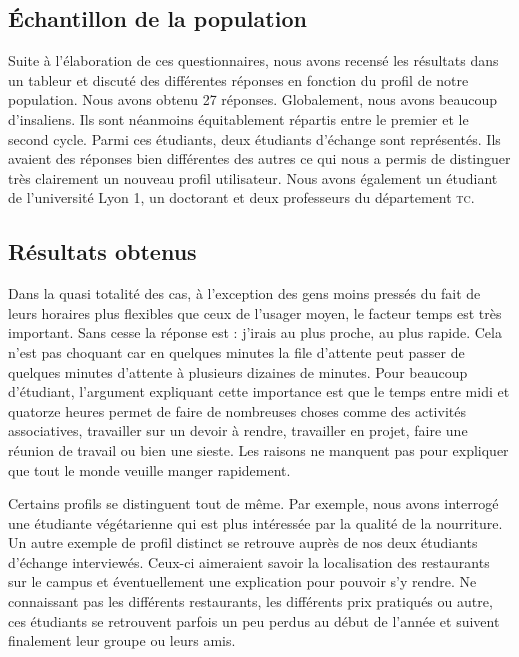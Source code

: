 \subsection{Échantillon de la population}
Suite à l'élaboration de ces questionnaires, nous avons recensé 
les résultats dans un tableur et discuté des différentes réponses en 
fonction du profil de notre population. Nous avons obtenu 27 réponses. 
Globalement, nous avons beaucoup d'insaliens. Ils sont néanmoins équitablement répartis
entre le premier et le second cycle. Parmi ces étudiants, deux
étudiants d'échange sont représentés. Ils avaient des réponses bien
différentes des autres ce qui nous a permis de distinguer très clairement un nouveau profil
utilisateur. Nous avons également un étudiant de l'université Lyon 1,
un doctorant et deux professeurs du département \textsc{tc}. 

\subsection{Résultats obtenus}
Dans la quasi totalité des cas, à l'exception des gens moins pressés 
du fait de leurs horaires plus flexibles que ceux de l'usager moyen, le
facteur temps est très important.  Sans cesse la réponse est : j'irais
au plus proche, au plus rapide. Cela
n'est pas choquant car en quelques minutes la file
d'attente peut passer de quelques minutes d'attente à plusieurs
dizaines de minutes. Pour beaucoup d'étudiant, l'argument expliquant cette
importance est que le temps entre midi et quatorze heures permet de faire de
nombreuses choses comme des activités associatives, travailler sur un devoir à rendre,
travailler en projet, faire une réunion de travail ou bien une sieste. Les raisons ne manquent pas 
pour expliquer que tout le monde veuille manger rapidement. 

Certains profils se distinguent tout de même. Par exemple, nous avons interrogé 
une étudiante végétarienne qui est plus intéressée par la qualité de la nourriture.
Un autre exemple de profil distinct se retrouve auprès de nos deux étudiants d'échange interviewés.
Ceux-ci aimeraient savoir la localisation des restaurants sur le campus et éventuellement une
explication pour pouvoir s'y rendre. Ne connaissant pas les différents restaurants, les
différents prix pratiqués ou autre, ces étudiants se retrouvent parfois un peu perdus au
début de l'année et suivent finalement leur groupe ou leurs amis.\\

